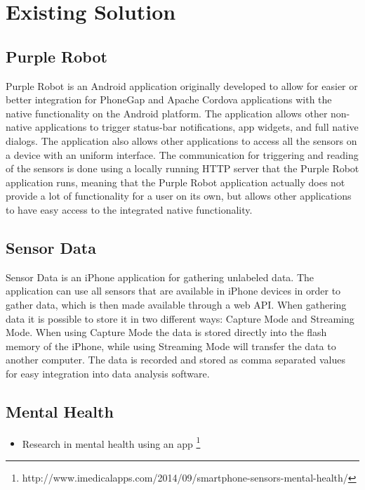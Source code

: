 
\section{Existing Solution}
\label{sec:existing_solution}


\subsection{Purple Robot}
\label{sub:purple_robot}

Purple Robot is an Android application originally developed to allow for easier or better integration for PhoneGap and Apache Cordova applications with the native functionality on the Android platform. The application allows other non-native applications to trigger status-bar notifications, app widgets, and full native dialogs. 
The application also allows other applications to access all the sensors on a device with an uniform interface. 
The communication for triggering and reading of the sensors is done using a locally running HTTP server that the Purple Robot application runs, meaning that the Purple Robot application actually does not provide a lot of functionality for a user on its own, but allows other applications to have easy access to the integrated native functionality.



\subsection{Sensor Data} 
\label{sub:sensor_data}

Sensor Data is an iPhone application for gathering unlabeled data. The application can use all sensors that are available in iPhone devices in order to gather data, which is then made available through a web API. When gathering data it is possible to store it in two different ways: Capture Mode and Streaming Mode. When using Capture Mode the data is stored directly into the flash memory of the iPhone, while using Streaming Mode will transfer the data to another computer. The data is recorded and stored as comma separated values for easy integration into data analysis software.


\subsection{Mental Health} %
\label{sub:mental_health}

\begin{itemize}
    \item Research in mental health using an app \footnote{http://www.imedicalapps.com/2014/09/smartphone-sensors-mental-health/}
\end{itemize}





